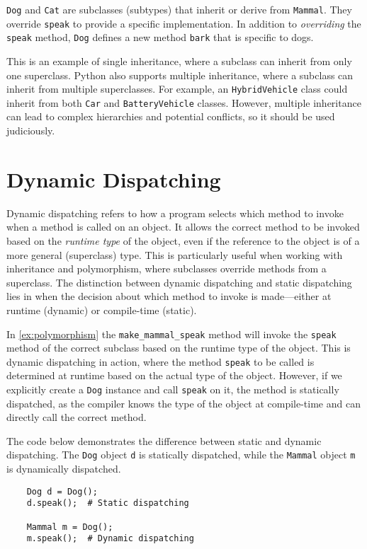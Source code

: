 \documentclass[oneside,11pt,dvipsnames]{book}
\newcommand{\code}[1]{\texttt{#1}}
\begin{document}
\code{Dog} and \code{Cat} are subclasses (subtypes) that inherit or derive from \code{Mammal}.  They override \code{speak} to provide a specific implementation.
In addition to \emph{overriding} the \code{speak} method, \code{Dog} defines a new method \code{bark} that is specific to dogs.

This is an example of single inheritance, where a subclass can inherit from only one superclass. Python also supports multiple inheritance, where a subclass can inherit from multiple superclasses. For example, an \code{HybridVehicle} class could inherit from both \code{Car} and \code{BatteryVehicle} classes. However, multiple inheritance can lead to complex hierarchies and potential conflicts, so it should be used judiciously.



\section{Dynamic Dispatching}

Dynamic dispatching refers to how a program selects which method to invoke when a method is called on an object.  It allows the correct method to be invoked based on the \emph{runtime type} of the object, even if the reference to the object is of a more general (superclass) type. This is particularly useful when working with inheritance and polymorphism, where subclasses override methods from a superclass.
The distinction between dynamic dispatching and static dispatching lies in when the decision about which method to invoke is made—either at runtime (dynamic) or compile-time (static).

In \autoref{ex:polymorphism} the \code{make\_mammal\_speak} method will invoke the \code{speak} method of the correct subclass based on the runtime type of the object. This is dynamic dispatching in action, where the method \code{speak} to be called is determined at runtime based on the actual type of the object.  However, if we explicitly create a \code{Dog} instance and call \code{speak} on it, the method is statically dispatched, as the compiler knows the type of the object at compile-time and can directly call the correct method.

The code below demonstrates the difference between static and dynamic dispatching. The \code{Dog} object \code{d} is statically dispatched, while the \code{Mammal} object \code{m} is dynamically dispatched.
\begin{lstlisting}
    Dog d = Dog();
    d.speak();  # Static dispatching

    Mammal m = Dog();
    m.speak();  # Dynamic dispatching
\end{lstlisting}    
\end{document}
